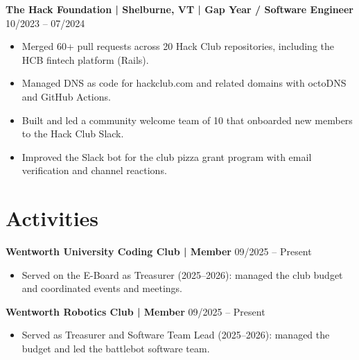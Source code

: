 \documentclass[10pt,letterpaper]{article}
\begin{document}
\vspace{4pt}
\noindent
\textbf{The Hack Foundation | Shelburne, VT | Gap Year / Software Engineer} \hfill 10/2023 -- 07/2024
\begin{itemize}
    \item Merged 60+ pull requests across 20 Hack Club repositories, including the HCB fintech platform (Rails).
    \item Managed DNS as code for hackclub.com and related domains with octoDNS and GitHub Actions.
    \item Built and led a community welcome team of 10 that onboarded new members to the Hack Club Slack.
    \item Improved the Slack bot for the club pizza grant program with email verification and channel reactions.
\end{itemize}




\section{Activities}
\noindent
\textbf{Wentworth University Coding Club | Member} \hfill 09/2025 -- Present
\begin{itemize}
    \item Served on the E-Board as Treasurer (2025--2026): managed the club budget and coordinated events and meetings.
\end{itemize}

\vspace{4pt}
\noindent
\textbf{Wentworth Robotics Club | Member} \hfill 09/2025 -- Present
\begin{itemize}
    \item Served as Treasurer and Software Team Lead (2025--2026): managed the budget and led the battlebot software team.
\end{itemize}
\end{document}
